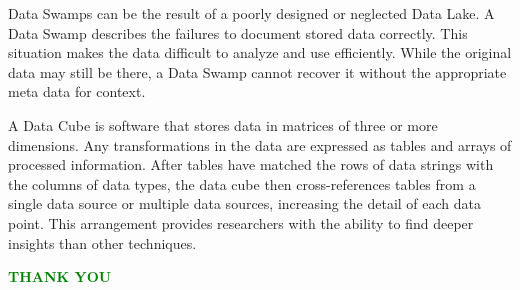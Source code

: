 \documentclass{article}
\begin{document}
Data Swamps can be the result of a poorly designed or neglected Data Lake. A Data Swamp describes the failures to document stored data correctly. This situation makes the data difficult to analyze and use efficiently. While the original data may still be there, a Data Swamp cannot recover it without the appropriate meta data for context.

A Data Cube is software that stores data in matrices of three or more dimensions. Any transformations in the data are expressed as tables and arrays of processed information. After tables have matched the rows of data strings with the columns of data types, the data cube then cross-references tables from a single data source or multiple data sources, increasing the detail of each data point. This arrangement provides researchers with the ability to find deeper insights than other techniques.
 
  \newpage
  \textcolor{green}{\huge{\bfseries THANK YOU}\\}  
  
\end{document}
